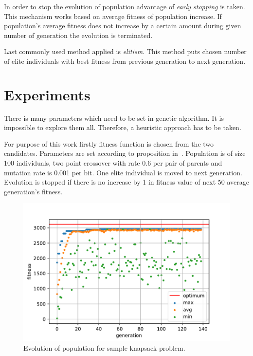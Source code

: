 \documentclass{article}
\begin{document}
In order to stop the evolution of population advantage of
\textit{early stopping} is taken.
This mechanism works based on average fitness of population increase.
If population's average fitness does not increase by a certain amount
during given number of generation the evolution is terminated.

Last commonly used method applied is \textit{elitism}.
This method puts chosen number of elite individuals with best fitness
from previous generation to next generation.

\section{Experiments}

There is many parameters which need to be set in genetic algorithm.
It is impossible to explore them all.
Therefore, a heuristic approach has to be taken.

For purpose of this work firstly fitness function is chosen
from the two candidates.
Parameters are set according to proposition in~\cite{dejong1975}.
Population is of size 100 individuals,
two point crossover with rate 0.6 per pair of parents
and mutation rate is 0.001 per bit.
One elite individual is moved to next generation.
Evolution is stopped if there is no increase by 1 in fitness
value of next 50 average generation's fitness.

\begin{figure}[ht]
\vskip 0.2in
\begin{center}
\centerline{\includegraphics[width=\columnwidth]{figs/evolution}}
\caption{Evolution of population for sample knapsack problem.}
\label{evolution}
\end{center}
\vskip -0.2in
\end{figure}
\end{document}
